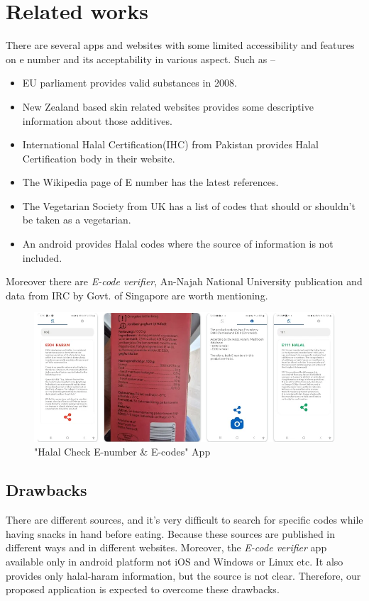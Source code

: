 \documentclass[a4paper,12pt]{report}
\begin{document}
\section*{Related works}
There are several apps and websites with some limited accessibility and features on e number and its acceptability in various aspect. Such as --
\begin{itemize}
	\item EU parliament provides valid substances in 2008. \cite{eu_perlament}
	\item New Zealand based skin related websites provides some descriptive information about those additives. \cite{dermnet_nz}
	\item International Halal Certification(IHC) from Pakistan provides Halal Certification body in their website. \cite{pak}
	\item The Wikipedia page of E number has the latest references. \cite{wiki_enumber}
	\item The Vegetarian Society from UK has a list of codes that should or shouldn't be taken as a vegetarian. \cite{veggie}
	\item An android provides Halal codes where the source of information is not included. \cite{halal_app}
\end{itemize}
Moreover there are \emph{E-code verifier}\cite{ecodeverifier}, An-Najah National University publication \cite{palestine} and data from IRC \cite{halal_singapore} by Govt. of Singapore are worth mentioning.
\begin{figure}[H]
	\centering
	\includegraphics[width=12cm,keepaspectratio]{halal_app.png}
	\caption{"Halal Check E-number \& E-codes" App}
\end{figure}
\subsection*{Drawbacks}
There are different sources, and it's very difficult to search for specific codes while having snacks in hand before eating. Because these sources are published in different ways and in different websites. Moreover, the \emph{E-code verifier} app available only in android platform not iOS and Windows or Linux etc. It also provides only halal-haram information, but the source is not clear. Therefore, our proposed application is expected to overcome these drawbacks.
\end{document}
